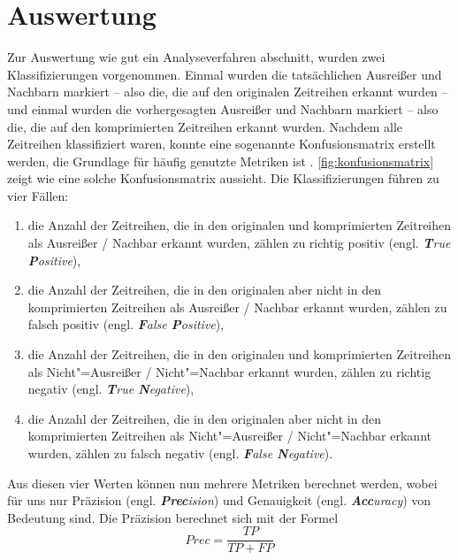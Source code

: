 \section{Auswertung}
\newcommand{\tikztextc}[3]{\node at (#1, #2) {\vphantom{/}\smash{#3}};}
\newcommand{\tikztextupc}[3]{\node at (#1, #2) [rotate = 90] {\vphantom{/}\smash{#3}};}
Zur Auswertung wie gut ein Analyseverfahren abschnitt, wurden zwei Klassifizierungen vorgenommen. Einmal wurden die tatsächlichen Ausreißer und Nachbarn markiert -- also die, die auf den originalen Zeitreihen erkannt wurden -- und einmal wurden die vorhergesagten Ausreißer und Nachbarn markiert -- also die, die auf den komprimierten Zeitreihen erkannt wurden. Nachdem alle Zeitreihen klassifiziert waren, konnte eine sogenannte Konfusionsmatrix erstellt werden, die Grundlage für häufig genutzte Metriken ist \cite{konfusionsmatrix}. \autoref{fig:konfusionsmatrix} zeigt wie eine solche Konfusionsmatrix aussieht. Die Klassifizierungen führen zu vier Fällen: \begin{enumerate}
    \item die Anzahl der Zeitreihen, die in den originalen und komprimierten Zeitreihen als Ausreißer / Nachbar erkannt wurden, zählen zu richtig positiv (engl. \textit{\textbf{T}rue \textbf{P}ositive}),
    \item die Anzahl der Zeitreihen, die in den originalen aber nicht in den komprimierten Zeitreihen als Ausreißer / Nachbar erkannt wurden, zählen zu falsch positiv (engl. \textit{\textbf{F}alse \textbf{P}ositive}),
    \item die Anzahl der Zeitreihen, die in den originalen und komprimierten Zeitreihen als Nicht"=Ausreißer / Nicht"=Nachbar erkannt wurden, zählen zu richtig negativ (engl. \textit{\textbf{T}rue \textbf{N}egative}),
    \item die Anzahl der Zeitreihen, die in den originalen aber nicht in den komprimierten Zeitreihen als Nicht"=Ausreißer / Nicht"=Nachbar erkannt wurden, zählen zu falsch negativ (engl. \textit{\textbf{F}alse \textbf{N}egative}).
\end{enumerate} 
Aus diesen vier Werten können nun mehrere Metriken berechnet werden, wobei für uns nur Präzision (engl. \textit{\textbf{Prec}ision}) und Genauigkeit (engl. \textit{\textbf{Acc}uracy}) von Bedeutung sind. Die Präzision berechnet sich mit der Formel \[Prec = \frac{TP}{TP + FP}\]
